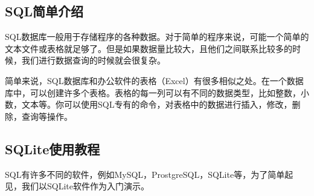 
\subsection{SQL简单介绍}
SQL数据库一般用于存储程序的各种数据。对于简单的程序来说，可能一个简单的文本文件或表格就足够了。但是如果数据量比较大，且他们之间联系比较多的时候，我们进行数据查询的时候就会很复杂。

简单来说，SQL数据库和办公软件的表格（Excel）有很多相似之处。在一个数据库中，可以创建许多个表格。表格的每一列可以有不同的数据类型，比如整数，小数，文本等。你可以使用SQL专有的命令，对表格中的数据进行插入，修改，删除，查询等操作。

\subsection{SQLite使用教程}
SQL有许多不同的软件，例如MySQL，ProstgreSQL，SQLite等，为了简单起见，我们以SQLite软件作为入门演示。

